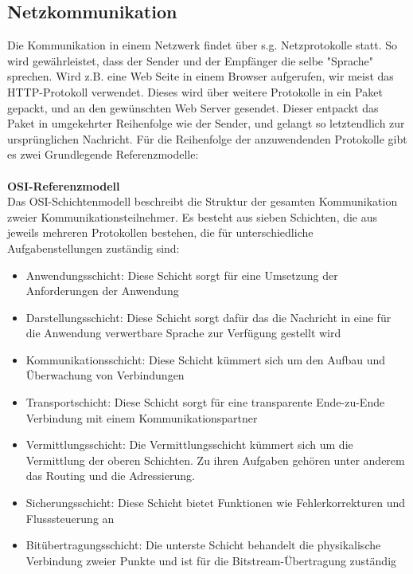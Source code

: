 \subsection{Netzkommunikation}
Die Kommunikation in einem Netzwerk findet über s.g. Netzprotokolle statt. So wird gewährleistet, dass der Sender und der Empfänger die selbe "Sprache" sprechen. Wird z.B. eine Web Seite in einem Browser aufgerufen, wir meist das HTTP-Protokoll verwendet. Dieses wird über weitere Protokolle in ein Paket gepackt, und an den gewünschten Web Server gesendet. Dieser entpackt das Paket in umgekehrter Reihenfolge wie der Sender, und gelangt so letztendlich zur ursprünglichen Nachricht. Für die Reihenfolge der anzuwendenden Protokolle gibt es zwei Grundlegende Referenzmodelle:\\
\\
\noindent\textbf{OSI-Referenzmodell}\\
\noindent Das  OSI-Schichtenmodell beschreibt die Struktur der gesamten Kommunikation zweier Kommunikationsteilnehmer. Es besteht aus sieben Schichten, die aus jeweils mehreren Protokollen bestehen, die für unterschiedliche Aufgabenstellungen zuständig sind:\\
\begin{itemize}
\item Anwendungsschicht: Diese Schicht sorgt für eine Umsetzung der Anforderungen der Anwendung
\item Darstellungsschicht: Diese Schicht sorgt dafür das die Nachricht in eine für die Anwendung verwertbare Sprache zur Verfügung gestellt wird
\item Kommunikationsschicht: Diese Schicht kümmert sich um den Aufbau und Überwachung von Verbindungen
\item Transportschicht: Diese Schicht sorgt für eine transparente Ende-zu-Ende Verbindung mit einem Kommunikationspartner
\item Vermittlungsschicht: Die Vermittlungsschicht kümmert sich um die Vermittlung der oberen Schichten. Zu ihren Aufgaben gehören unter anderem das Routing und die Adressierung.
\item Sicherungsschicht: Diese Schicht bietet Funktionen wie Fehlerkorrekturen und Flusssteuerung an
\item Bitübertragungsschicht: Die unterste Schicht behandelt die physikalische Verbindung zweier Punkte und ist für die Bitstream-Übertragung zuständig 
\end{itemize}


